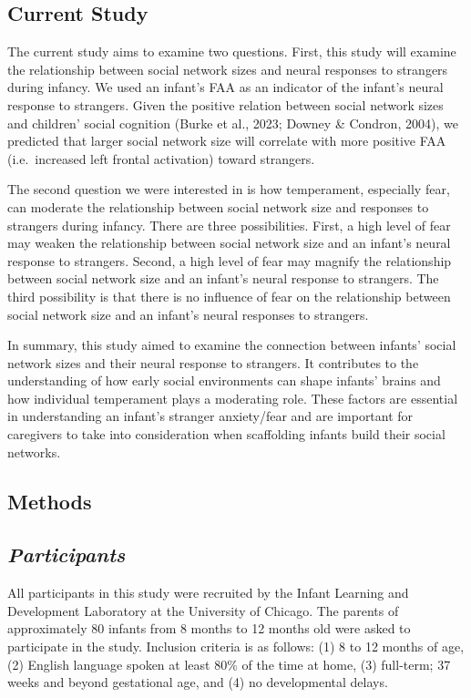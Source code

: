 \documentclass[
  man,
  floatsintext,
  longtable,
  nolmodern,
  notxfonts,
  notimes,
  colorlinks=true,linkcolor=blue,citecolor=blue,urlcolor=blue]{apa7}
\begin{document}
\subsection{Current Study}\label{current-study}

The current study aims to examine two questions. First, this study will
examine the relationship between social network sizes and neural
responses to strangers during infancy. We used an infant's FAA as an
indicator of the infant's neural response to strangers. Given the
positive relation between social network sizes and children' social
cognition (Burke et al., 2023; Downey \& Condron, 2004), we predicted
that larger social network size will correlate with more positive FAA
(i.e.~increased left frontal activation) toward strangers.

The second question we were interested in is how temperament, especially
fear, can moderate the relationship between social network size and
responses to strangers during infancy. There are three possibilities.
First, a high level of fear may weaken the relationship between social
network size and an infant's neural response to strangers. Second, a
high level of fear may magnify the relationship between social network
size and an infant's neural response to strangers. The third possibility
is that there is no influence of fear on the relationship between social
network size and an infant's neural responses to strangers.

In summary, this study aimed to examine the connection between infants'
social network sizes and their neural response to strangers. It
contributes to the understanding of how early social environments can
shape infants' brains and how individual temperament plays a moderating
role. These factors are essential in understanding an infant's stranger
anxiety/fear and are important for caregivers to take into consideration
when scaffolding infants build their social networks.

\subsection{Methods}\label{methods}

\subsection{\texorpdfstring{\emph{Participants}}{Participants}}\label{participants}

All participants in this study were recruited by the Infant Learning and
Development Laboratory at the University of Chicago. The parents of
approximately 80 infants from 8 months to 12 months old were asked to
participate in the study. Inclusion criteria is as follows: (1) 8 to 12
months of age, (2) English language spoken at least 80\% of the time at
home, (3) full-term; 37 weeks and beyond gestational age, and (4) no
developmental delays.
\end{document}

